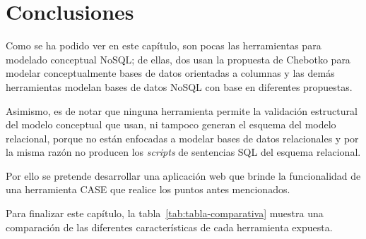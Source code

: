 \newpage\section{Conclusiones}

Como se ha podido ver en este capítulo, son pocas las herramientas para modelado conceptual NoSQL; de ellas, dos usan la propuesta de Chebotko para modelar conceptualmente bases de datos orientadas a columnas y las demás herramientas modelan bases de datos NoSQL con base en diferentes propuestas.


Asimismo, es de notar que ninguna herramienta permite la validación estructural del modelo conceptual que usan, ni tampoco generan el esquema del modelo relacional, porque no están enfocadas a modelar bases de datos relacionales y por la misma razón no producen los \textit{scripts} de sentencias SQL del esquema relacional.


Por ello se pretende desarrollar una aplicación web que brinde la funcionalidad de una herramienta CASE que realice los puntos antes mencionados.


Para finalizar este capítulo, la tabla~\ref{tab:tabla-comparativa} muestra una comparación de las diferentes características de cada herramienta expuesta.

